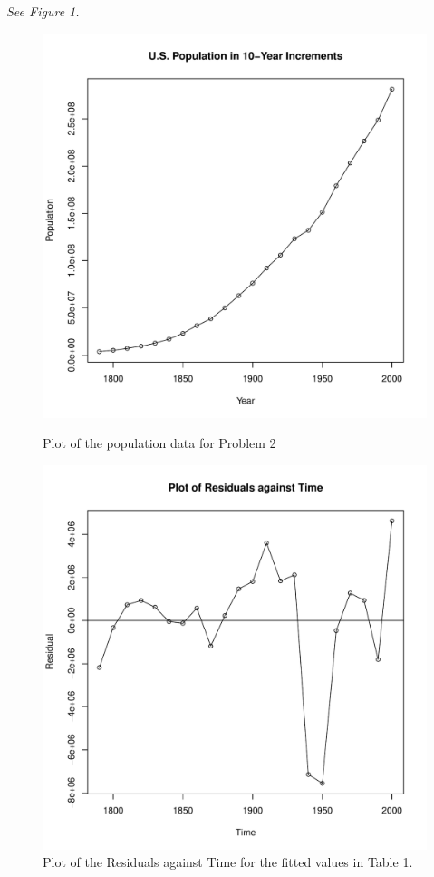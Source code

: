 \documentclass[a4paper, 11pt]{article}
\begin{document}
\begin{itemize}
\begin{enumerate}[(a)]
		\emph{See Figure 1.}
\begin{figure}
\centering
\begin{minipage}{.5\textwidth}
  \centering
	\includegraphics[scale=0.5]{hw1_dataplot.pdf}
  \caption{Plot of the population data for Problem 2}
\end{minipage}%
\begin{minipage}{.5\textwidth}
  \centering
  \includegraphics[scale=0.5]{hw1_resid.pdf}
  \caption{Plot of the Residuals against Time for the fitted values in Table 1.}
\end{minipage}
\end{figure}


\end{enumerate}
\end{itemize}
\end{document}
